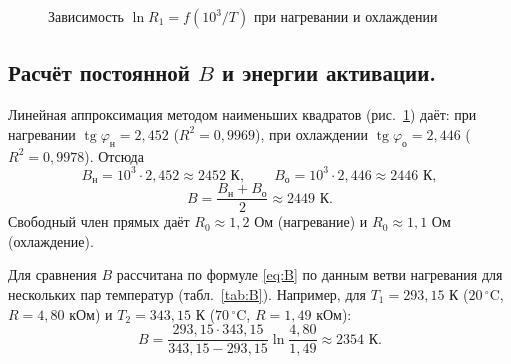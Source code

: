 \documentclass[12pt, a4paper]{article}
\begin{document}
\begin{figure}[H]
		\caption{Зависимость $\ln R_1 = f(10^3/T)$ при нагревании и охлаждении}
		\label{fig:lnR}
	\end{figure}
	
	\subsection{Расчёт постоянной $B$ и энергии активации.}
	Линейная аппроксимация методом наименьших квадратов (рис.~\ref{fig:lnR}) даёт: при нагревании $\operatorname{tg}\varphi_{\text{н}} = 2,452$ ($R^2 = 0,9969$), при охлаждении $\operatorname{tg}\varphi_{\text{о}} = 2,446$ ($R^2 = 0,9978$). Отсюда
	\[
	B_{\text{н}} = 10^3 \cdot 2,452 \approx 2452 \text{ К}, \qquad B_{\text{о}} = 10^3 \cdot 2,446 \approx 2446 \text{ К},
	\]
	\[
	B = \frac{B_{\text{н}} + B_{\text{о}}}{2} \approx 2449 \text{ К}.
	\]
	Свободный член прямых даёт $R_0 \approx 1,2$ Ом (нагревание) и $R_0 \approx 1,1$ Ом (охлаждение).
	
	Для сравнения $B$ рассчитана по формуле \eqref{eq:B} по данным ветви нагревания для нескольких пар температур (табл.~\ref{tab:B}). Например, для $T_1 = 293{,}15$ К ($20\,^\circ$C, $R = 4{,}80$ кОм) и $T_2 = 343{,}15$ К ($70\,^\circ$C, $R = 1{,}49$ кОм):
	\[
	B = \frac{293{,}15 \cdot 343{,}15}{343{,}15 - 293{,}15} \ln \frac{4{,}80}{1{,}49} \approx 2354 \text{ К}.
	\]
	
\end{document}
